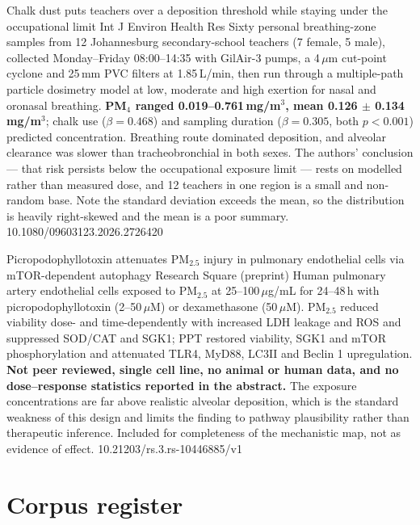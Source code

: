 \documentclass[10pt]{article}
\begin{document}
{Chalk dust puts teachers over a deposition threshold while staying under the
occupational limit}
{Int J Environ Health Res}
{Sixty personal breathing-zone samples from 12 Johannesburg secondary-school teachers
(7 female, 5 male), collected Monday--Friday 08:00--14:35 with GilAir-3 pumps, a 4\,$\mu$m
cut-point cyclone and 25\,mm PVC filters at 1.85\,L/min, then run through a multiple-path
particle dosimetry model at low, moderate and high exertion for nasal and oronasal
breathing. \textbf{PM$_4$ ranged 0.019--0.761\,mg/m$^3$, mean 0.126 $\pm$
0.134\,mg/m$^3$}; chalk use ($\beta=0.468$) and sampling duration ($\beta=0.305$, both
$p<0.001$) predicted concentration. Breathing route dominated deposition, and alveolar
clearance was slower than tracheobronchial in both sexes. The authors' conclusion --- that
risk persists below the occupational exposure limit --- rests on modelled rather than
measured dose, and 12 teachers in one region is a small and non-random base. Note the
standard deviation exceeds the mean, so the distribution is heavily right-skewed and the
mean is a poor summary.}
{10.1080/09603123.2026.2726420}


{Picropodophyllotoxin attenuates PM$_{2.5}$ injury in pulmonary endothelial cells via
mTOR-dependent autophagy}
{Research Square (preprint)}
{Human pulmonary artery endothelial cells exposed to PM$_{2.5}$ at 25--100\,$\mu$g/mL for
24--48\,h with picropodophyllotoxin (2--50\,$\mu$M) or dexamethasone (50\,$\mu$M).
PM$_{2.5}$ reduced viability dose- and time-dependently with increased LDH leakage and ROS
and suppressed SOD/CAT and SGK1; PPT restored viability, SGK1 and mTOR phosphorylation and
attenuated TLR4, MyD88, LC3II and Beclin 1 upregulation. \textbf{Not peer reviewed, single
cell line, no animal or human data, and no dose--response statistics reported in the
abstract.} The exposure concentrations are far above realistic alveolar deposition, which
is the standard weakness of this design and limits the finding to pathway plausibility
rather than therapeutic inference. Included for completeness of the mechanistic map,
not as evidence of effect.}
{10.21203/rs.3.rs-10446885/v1}

\clearpage

\section*{\sffamily\bfseries\color{Deep}Corpus register}
\vspace{-1.5mm}{\color{Amber}\rule{\linewidth}{1.1pt}}\vspace{2.5mm}
\end{document}
